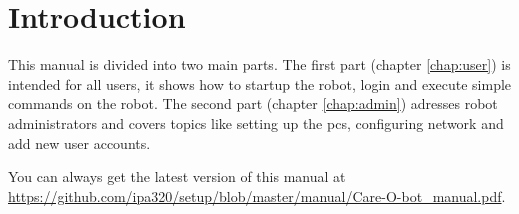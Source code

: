 \chapter{Introduction}
\label{chap:introduction} 

This manual is divided into two main parts. The first part (chapter \ref{chap:user}) is intended for all users, it shows how to startup the robot, login and execute simple commands on the robot. The second part (chapter \ref{chap:admin}) adresses robot administrators and covers topics like setting up the pcs, configuring network and add new user accounts.

You can always get the latest version of this manual at \url{https://github.com/ipa320/setup/blob/master/manual/Care-O-bot_manual.pdf}.


